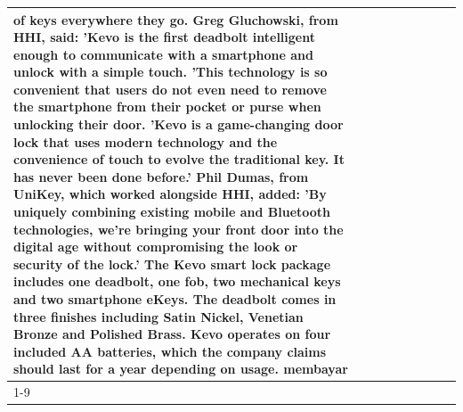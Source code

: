 \begin{table}[H]
\begin{tabular}{lllrlllll}
of keys everywhere they go. Greg Gluchowski, from HHI, said: 'Kevo is the first deadbolt intelligent enough to communicate with a smartphone and unlock with a simple touch. 'This technology is so convenient that users do not even need to remove the smartphone from their pocket or purse when unlocking their door. 'Kevo is a game-changing door lock that uses modern technology and the convenience of touch to evolve the traditional key. It has never been done before.' Phil Dumas, from UniKey, which worked alongside HHI, added: 'By uniquely combining existing mobile and Bluetooth technologies, we’re bringing your front door into the digital age without compromising the look or security of the lock.' The Kevo smart lock package includes one deadbolt, one fob, two mechanical keys and two smartphone eKeys. The deadbolt comes in three finishes including Satin Nickel, Venetian Bronze and Polished Brass. Kevo operates on four included AA batteries, which the company claims should last for a year depending on usage. membayar \\
\cline{1-9}
\bottomrule
\end{tabular}
\end{table}
